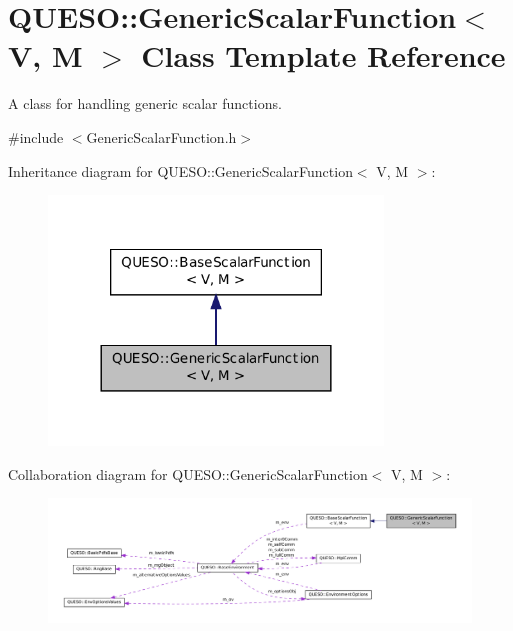 \hypertarget{class_q_u_e_s_o_1_1_generic_scalar_function}{\section{Q\-U\-E\-S\-O\-:\-:Generic\-Scalar\-Function$<$ V, M $>$ Class Template Reference}
\label{class_q_u_e_s_o_1_1_generic_scalar_function}
}


A class for handling generic scalar functions.  




{\ttfamily \#include $<$Generic\-Scalar\-Function.\-h$>$}



Inheritance diagram for Q\-U\-E\-S\-O\-:\-:Generic\-Scalar\-Function$<$ V, M $>$\-:
\nopagebreak
\begin{figure}[H]
\begin{center}
\leavevmode
\includegraphics[width=252pt]{class_q_u_e_s_o_1_1_generic_scalar_function__inherit__graph}
\end{center}
\end{figure}


Collaboration diagram for Q\-U\-E\-S\-O\-:\-:Generic\-Scalar\-Function$<$ V, M $>$\-:
\nopagebreak
\begin{figure}[H]
\begin{center}
\leavevmode
\includegraphics[width=350pt]{class_q_u_e_s_o_1_1_generic_scalar_function__coll__graph}
\end{center}
\end{figure}
